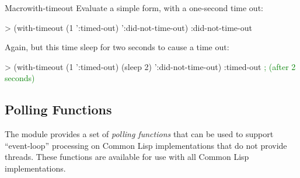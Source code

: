 \documentclass[10pt,twoside,english,pdftex]{article}
\begin{document}
\begin{functiondoc}{Macro}{with-timeout}{\code{(} 
    \superstar{}\code{)}
    \superstar{} 
    \returns{} \superstar}
\fnexamples
Evaluate a simple form, with a one-second time out:
\begin{example}
> (with-timeout (1 ':timed-out) 
     ':did-not-time-out)
:did-not-time-out
\end{example}

Again, but this time sleep for two seconds to cause a time out:
\begin{example}
> (with-timeout (1 ':timed-out)
     (sleep 2) 
     ':did-not-time-out)
:timed-out              \textrm{\textcolor{green}{; (after 2 seconds)}}
\end{example}

\end{functiondoc}


\T\markright{}%
\T\pagestyle{plain}
\T\clearpage
\W{}
\T\pagestyle{fancy}
\T\thispagestyle{fancybottom}
\T\global\def\fnlastname{ }%

\subsection{Polling Functions}
\label{sec:pollingfunctions}%

%
%
The  module provides a set of \textit{polling
  functions\/} that can be used to support ``event-loop'' processing on Common
Lisp implementations that do not provide threads.  These functions are
available for use with all Common Lisp implementations.

\W\entities
\T\clearpage

\end{document}
